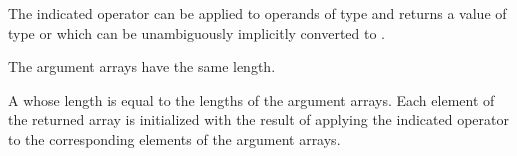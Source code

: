 \begin{itemdescr}
\pnum
\mandates
The indicated operator can be applied to operands of type  and returns
a value of type  or which can be unambiguously
implicitly converted to .

\pnum
\expects
The argument arrays have the same length.

\pnum
\returns
A  whose length is equal to the
lengths of the argument arrays.
Each element of the returned array is
initialized with the result of applying the indicated operator to the
corresponding elements of the argument arrays.
\end{itemdescr}

%
%
%
%
%
%
%
%
%
%
